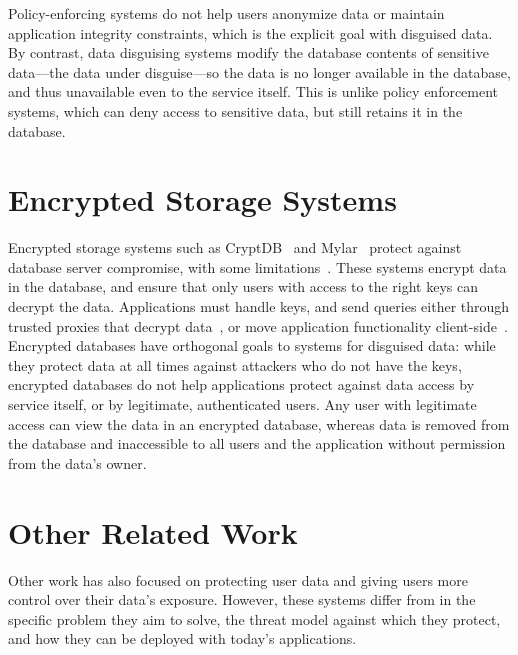%
Policy-enforcing systems do not help users anonymize data or maintain
application integrity constraints, which is the explicit goal with disguised
data.
%
By contrast, data disguising systems modify the database contents of sensitive
data---the data under disguise---so the data is no longer available in the
database, and thus unavailable even to the service itself. This is unlike policy
enforcement systems, which can deny access to sensitive data, but still
retains it in the database.
%

\section{Encrypted Storage Systems}
Encrypted storage systems such as CryptDB~\cite{cryptdb} and
Mylar~\cite{mylar} protect against database server compromise, with some
limitations~\cite{grubbs}.
%
These systems encrypt data in the database, and
ensure that only users with access to the right keys can decrypt the data.
%
Applications must handle keys, and send queries
either through trusted proxies that decrypt data~\cite{cryptdb}, or move
application functionality client-side~\cite{mylar}.
%
Encrypted databases have orthogonal goals to systems for disguised data: while
they protect data at all times against attackers who do not have the keys,
encrypted databases do not help applications protect against data access by
service itself, or by legitimate, authenticated users. 
%
Any user with legitimate access can view the data in an encrypted database,
whereas \xxed data is removed from the database and inaccessible to all users
and the application without permission from the data's owner.
%
%

\section{Other Related Work} 
Other work has also focused on protecting user data and giving users more
control over their data's exposure. However, these systems differ from \sys in
the specific problem they aim to solve, the threat model against which they
protect, and how they can be deployed with today's applications.


